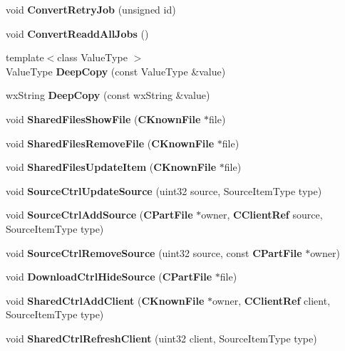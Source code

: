 \begin{DoxyCompactItemize}
\item 
void {\bfseries ConvertRetryJob} (unsigned id)\label{namespaceMuleNotify_a63ba13addbbed78695873a7a8a40ccdc}

\item 
void {\bfseries ConvertReaddAllJobs} ()\label{namespaceMuleNotify_a1a442efceeeeb37d1daa9bf7b8e1276b}

\item 
{\footnotesize template$<$class ValueType $>$ }\\ValueType {\bf DeepCopy} (const ValueType \&value)
\item 
wxString {\bf DeepCopy} (const wxString \&value)
\item 
void {\bfseries SharedFilesShowFile} ({\bf CKnownFile} $\ast$file)\label{namespaceMuleNotify_adeb07ad8fa61c92a93add93aa9e64c04}

\item 
void {\bfseries SharedFilesRemoveFile} ({\bf CKnownFile} $\ast$file)\label{namespaceMuleNotify_ac91dde2ad448d788134260092adb7ffd}

\item 
void {\bfseries SharedFilesUpdateItem} ({\bf CKnownFile} $\ast$file)\label{namespaceMuleNotify_ab1a225c6947210d07c29846af96ca112}

\item 
void {\bfseries SourceCtrlUpdateSource} (uint32 source, SourceItemType type)\label{namespaceMuleNotify_a9153b638f2b9f2daffbe6f5ae341a075}

\item 
void {\bfseries SourceCtrlAddSource} ({\bf CPartFile} $\ast$owner, {\bf CClientRef} source, SourceItemType type)\label{namespaceMuleNotify_a16859917091cb4f44588cc721cd0a7a3}

\item 
void {\bfseries SourceCtrlRemoveSource} (uint32 source, const {\bf CPartFile} $\ast$owner)\label{namespaceMuleNotify_a1b41975c1a5b728b63aca795a56cee2f}

\item 
void {\bfseries DownloadCtrlHideSource} ({\bf CPartFile} $\ast$file)\label{namespaceMuleNotify_a2cb9abfa2c1a967b7c2fae7804403ea9}

\item 
void {\bfseries SharedCtrlAddClient} ({\bf CKnownFile} $\ast$owner, {\bf CClientRef} client, SourceItemType type)\label{namespaceMuleNotify_a52e7c87c938e97fa6d1002fe57beef47}

\item 
void {\bfseries SharedCtrlRefreshClient} (uint32 client, SourceItemType type)\label{namespaceMuleNotify_ad09af07c500ee4ba7110f66e6706bcfb}


\end{DoxyCompactItemize}
